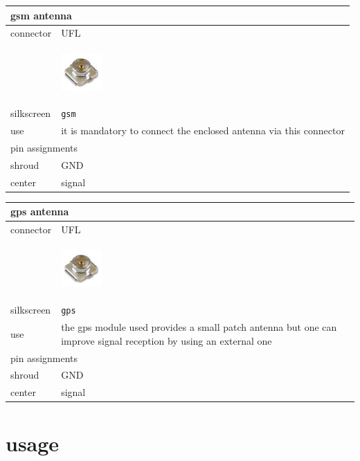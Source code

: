 \documentclass[a4paper,twoside]{refart}
\begin{document}
\begin{tabular}{ |l|p{8cm}| }
    \hline
    \multicolumn{2}{|l|}{gsm antenna} \\
    \hline
        connector & UFL \\
         & \begin{center} \includegraphics[height=40pt]{img/ufl} \end{center} \\ \hline
        silkscreen & \verb"gsm" \\ \hline
        use & it is mandatory to connect the enclosed antenna via this connector \\
    \hline
    \multicolumn{2}{|l|}{pin assignments} \\
    \hline
        shroud   &   GND \\
        center   &   signal \\
    \hline
\end{tabular}

\begin{tabular}{ |l|p{8cm}| }
    \hline
    \multicolumn{2}{|l|}{gps antenna} \\
    \hline
        connector & UFL \\
         & \begin{center} \includegraphics[height=40pt]{img/ufl} \end{center} \\ \hline
        silkscreen & \verb"gps" \\ \hline
        use & the gps module used provides a small patch antenna but one can improve signal reception by using an external one \\
    \hline
    \multicolumn{2}{|l|}{pin assignments} \\
    \hline
        shroud   &   GND \\
        center   &   signal \\
    \hline
\end{tabular}

\newpage
\section{usage}
\end{document}
